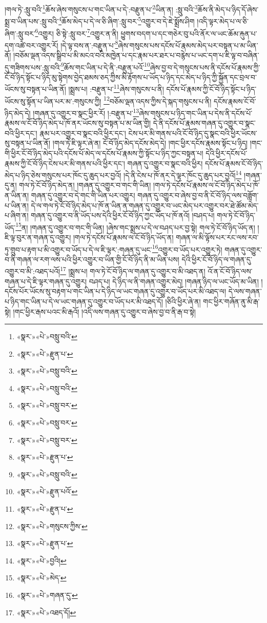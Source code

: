 །གལ་ཏེ་:སླུ་བའི་\footnote{«སྣར་»«པེ་»བསླུ་བའི་}ཆོས་ཞེས་གསུངས་པ་གང་ཡིན་པ་དེ་:བརྫུན་པ་\footnote{«སྣར་»«པེ་»རྫུན་པ་}ཡིན་ན། :སླུ་བའི་\footnote{«སྣར་»«པེ་»བསླུ་བའི་}ཆོས་ནི་མེད་པ་ཉིད་དོ་ཞེས་སྨྲ་བ་ཡིན་པས་:སླུ་བའི་\footnote{«སྣར་»«པེ་»བསླུ་བའི་}ཆོས་མེད་པ་དེ་ལ་ཅི་ཞིག་:སླུ་བར་\footnote{«སྣར་»«པེ་»བསླུ་བར་}འགྱུར་བ་དེ་ཇེ་སྨྲོས་ཤིག །འདི་ལྟར་མེད་པ་ལ་ཅི་ཞིག་:སླུ་བར་\footnote{«སྣར་»«པེ་»བསླུ་བར་}འགྱུར། ཅི་སྟེ་:སླུ་བར་\footnote{«སྣར་»«པེ་»བསླུ་བར་}འགྱུར་ན་ནི། ཕྱུགས་བདག་པ་དང་གཅེར་བུ་པའི་ནོར་ལ་ཡང་ཆོམ་རྐུན་པ་དག་འཚེ་བར་འགྱུར་རོ། །དེ་ལྟ་བས་ན་:བརྫུན་པ་\footnote{«སྣར་»«པེ་»རྫུན་པ་}ཞེས་གསུངས་པས་དངོས་པོ་རྣམས་མེད་པར་བསྟན་པ་མ་ཡིན་ནོ། །བཅོམ་ལྡན་འདས་སྒྲིབ་པ་མི་མངའ་བའི་མཁྱེན་པ་དང་རྣམ་པར་ཐར་པ་བརྙེས་པ་ཡང་དག་པ་ཇི་ལྟ་བ་བཞིན་དུ་གཟིགས་པས་:སླུ་བའི་\footnote{«སྣར་»«པེ་»བསླུ་བའི་}ཆོས་གང་ཡིན་པ་དེ་ནི་:བརྫུན་པའོ་\footnote{«སྣར་»«པེ་»རྫུན་པའོ་}ཞེས་བྱ་བ་དེ་གསུངས་པས་ནི་དངོས་པོ་རྣམས་ཀྱི་ངོ་བོ་ཉིད་སྟོང་པ་ཉིད་མུ་སྟེགས་བྱེད་ཐམས་ཅད་ཀྱིས་མི་རྟོགས་པ་ཡོད་པ་ཉིད་དང་མེད་པ་ཉིད་ཀྱི་སྐྱོན་དང་བྲལ་བ་ཡོངས་སུ་བསྟན་པ་ཡིན་ནོ། །སྨྲས་པ། :བརྫུན་པ་\footnote{«སྣར་»«པེ་»རྫུན་པ་}ཞེས་གསུངས་པ་ནི། དངོས་པོ་རྣམས་ཀྱི་ངོ་བོ་ཉིད་སྟོང་པ་ཉིད་ཡོངས་སུ་སྟོན་པ་ཡིན་པར་མ་:གསུངས་ཀྱི། \footnote{«སྣར་»«པེ་»གསུངས་ཀྱིས་}བཅོམ་ལྡན་འདས་ཀྱིས་དེ་སྐད་གསུངས་པ་ནི། དངོས་རྣམས་ངོ་བོ་ཉིད་མེད་དེ། །གཞན་དུ་འགྱུར་བ་སྣང་ཕྱིར་རོ། །:བརྫུན་པ་\footnote{«སྣར་»«པེ་»རྫུན་པ་}ཞེས་གསུངས་པ་ཉིད་གང་ཡིན་པ་དེས་ནི་དངོས་པོ་རྣམས་ལ་ངོ་བོ་ཉིད་མེད་པ་ཁོ་ནར་ཡོངས་སུ་བསྟན་པ་མ་ཡིན་གྱི། དེ་ནི་དངོས་པོ་རྣམས་གཞན་དུ་འགྱུར་བ་སྣང་བའི་ཕྱིར་དང་། རྣམ་པར་འགྱུར་བ་སྣང་བའི་ཕྱིར་དང་། ངེས་པར་མི་གནས་པའི་ངོ་བོ་ཉིད་དུ་སྣང་བའི་ཕྱིར་ཡོངས་སུ་བསྟན་པ་ཡིན་ནོ། །གལ་ཏེ་ཇི་ལྟར་ཞེ་ན། ངོ་བོ་ཉིད་མེད་དངོས་མེད་དེ། །གང་ཕྱིར་དངོས་རྣམས་སྟོང་པ་ཉིད། །གང་གི་ཕྱིར་ངོ་བོ་ཉིད་མེད་པའི་དངོས་པོ་མེད་ལ་དངོས་པོ་རྣམས་ཀྱི་སྟོང་པ་ཉིད་ཀྱང་བསྟན་པ། དེའི་ཕྱིར་དངོས་པོ་རྣམས་ཀྱི་ངོ་བོ་ཉིད་ངེས་པར་མི་གནས་པའི་ཕྱིར་དང་། གཞན་དུ་འགྱུར་བ་སྣང་བའི་ཕྱིར། དངོས་པོ་རྣམས་ངོ་བོ་ཉིད་མེད་པ་ཉིད་ཅེས་གསུངས་པར་ཁོང་དུ་ཆུད་པར་བྱའོ། །དེ་ནི་ངེས་པ་ཁོ་ནར་དེ་ལྟར་ཁོང་དུ་ཆུད་པར་བྱའོ།\footnote{«སྣར་»«པེ་»བྱའི།} །གཞན་དུ་ན། གལ་ཏེ་ངོ་བོ་ཉིད་མེད་ན། །གཞན་དུ་འགྱུར་བ་གང་གི་ཡིན། །གལ་ཏེ་དངོས་པོ་རྣམས་ལ་ངོ་བོ་ཉིད་མེད་པ་ཁོ་ན་ཡིན་ན། གཞན་དུ་འགྱུར་བ་དེ་གང་གི་ཡིན་པར་འགྱུར། གཞན་དུ་འགྱུར་བ་ཞེས་བྱ་བ་ནི་ངོ་བོ་ཉིད་ལས་བཟློག་པ་ཡིན་ན། དེ་ལ་གལ་ཏེ་ངོ་བོ་ཉིད་མེད་པ་ཁོ་ན་ཡིན་ན་གཞན་དུ་འགྱུར་བ་ཡང་མེད་པར་འགྱུར་བར་ཐེ་ཚོམ་མེད་པ་ཞིག་ན། གཞན་དུ་འགྱུར་བ་ནི་ཡོད་པས་དེའི་ཕྱིར་ངོ་བོ་ཉིད་ཀྱང་ཡོད་པ་ཁོ་ནའོ། །བཤད་པ། གལ་ཏེ་ངོ་བོ་ཉིད་ཡོད་\footnote{«སྣར་»«པེ་»མེད་}ན། །གཞན་དུ་འགྱུར་བ་གང་གི་ཡིན། །ཞེས་གང་སྨྲས་པ་དེ་ལ་བཤད་པར་བྱ་སྟེ། གལ་ཏེ་ངོ་བོ་ཉིད་ཡོད་ན། །ཇི་ལྟ་བུར་ན་གཞན་དུ་འགྱུར། །གལ་ཏེ་དངོས་པོ་རྣམས་ལ་ངོ་བོ་ཉིད་ཡོད་ན། གཞན་ལ་མི་ལྟོས་པར་རང་ལས་རབ་ཏུ་གྲུབ་པ་རྟག་པ་མི་འགྱུར་བ་ཡོད་པ་དེ་ལ་ཇི་ལྟར་:གཞན་དུ་ཡང་\footnote{«སྣར་»«པེ་»གཞན་དུ་}འགྱུར་བ་ཡོད་པར་འགྱུར་ཏེ། གཞན་དུ་འགྱུར་བ་ནི་གཞན་ལ་རག་ལས་པའི་ཕྱིར་འགྱུར་བ་ཡིན་གྱི་ངོ་བོ་ཉིད་ནི་མ་ཡིན་པས། དེའི་ཕྱིར་ངོ་བོ་ཉིད་ལ་གཞན་དུ་འགྱུར་བ་མི་:འཐད་པའོ།\footnote{«སྣར་»«པེ་»འཐད་དོ།} །སྨྲས་པ། གལ་ཏེ་ངོ་བོ་ཉིད་ལ་གཞན་དུ་འགྱུར་བ་མི་འཐད་ན། འོ་ན་ངོ་བོ་ཉིད་ལས་གཞན་པ་དེ་ཇི་ལྟར་གཞན་དུ་འགྱུར། བཤད་པ། དེ་ཉིད་ལ་ནི་གཞན་འགྱུར་མེད། །གཞན་ཉིད་ལ་ཡང་ཡོད་མ་ཡིན། །དངོས་པོར་ཡོངས་སུ་བརྟག་པ་གང་ཡིན་པ་དེ་ཉིད་ལ་ཡང་གཞན་དུ་འགྱུར་བ་ཡོད་པར་མི་འཐད་ལ། དེ་ལས་གཞན་པ་ཉིད་གང་ཡིན་པ་དེ་ལ་ཡང་གཞན་དུ་འགྱུར་བ་ཡོད་པར་མི་འཐད་དོ། །ཅིའི་ཕྱིར་ཞེ་ན། གང་ཕྱིར་གཞོན་ནུ་མི་རྒ་སྟེ། །གང་ཕྱིར་རྒས་པའང་མི་རྒའོ། །འདི་ལས་གཞན་དུ་འགྱུར་བ་ཞེས་བྱ་བ་ནི་རྒ་བ་སྟེ། 